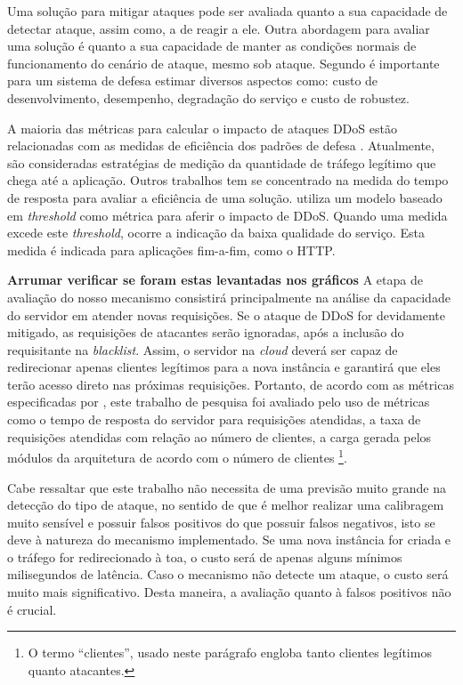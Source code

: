 

%
Uma solução para mitigar ataques pode ser avaliada quanto a sua capacidade de detectar ataque, assim como, a de reagir a ele. Outra abordagem para avaliar uma solução é quanto a sua capacidade de manter as condições normais de funcionamento do cenário de ataque, mesmo sob ataque. Segundo \cite{4600003} é importante para um sistema de defesa estimar diversos aspectos como: custo de desenvolvimento, desempenho, degradação do serviço e custo de robustez. 

A maioria das métricas para calcular o impacto de ataques DDoS estão relacionadas com as medidas de eficiência dos padrões de defesa \cite{4809152}. Atualmente, são consideradas estratégias de medição da quantidade de tráfego legítimo que chega até a aplicação. Outros trabalhos tem se concentrado na medida do tempo de resposta para avaliar a eficiência de uma solução. \cite{Mirkovic:2007:TUM:1281700.1281708} utiliza um modelo baseado em \emph{threshold} como métrica para aferir o impacto de DDoS. Quando uma medida excede este \emph{threshold}, ocorre a  indicação da baixa qualidade do serviço. Esta medida é indicada para aplicações fim-a-fim, como o HTTP.

\textbf{Arrumar verificar se foram estas levantadas nos gráficos}
A etapa de avaliação do nosso mecanismo consistirá principalmente na análise
da capacidade do servidor em atender novas requisições. Se o ataque de DDoS for devidamente
mitigado, as requisições de atacantes serão ignoradas, após a inclusão do requisitante na \emph{blacklist}. Assim, o servidor na \emph{cloud} deverá ser capaz de redirecionar apenas clientes legítimos 
para a nova instância e garantirá que eles terão acesso direto nas próximas requisições. 
Portanto, de acordo com as métricas especificadas por \cite{4600003}, este trabalho de pesquisa foi avaliado pelo uso de métricas como o tempo de resposta do servidor para requisições atendidas, a taxa de requisições atendidas com relação ao número de clientes, a carga gerada pelos módulos da arquitetura de acordo com o número de clientes \footnote{O termo ``clientes'', usado neste parágrafo engloba tanto clientes legítimos quanto atacantes.}. 

Cabe ressaltar que este trabalho não necessita de uma previsão muito grande na detecção do tipo de ataque, no sentido de que é melhor realizar uma calibragem muito sensível e possuir falsos positivos do que possuir falsos negativos, isto se deve à natureza do mecanismo implementado. Se uma nova instância for criada e o tráfego for redirecionado à toa, o custo será de apenas alguns mínimos milisegundos de latência. Caso o mecanismo não detecte um ataque, o custo será muito mais significativo. Desta maneira, a avaliação quanto à falsos positivos não é crucial. %
